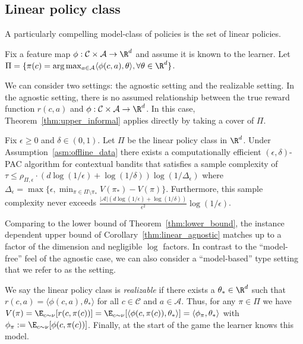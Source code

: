 \documentclass{article}
\newcommand{\mc}[1]{\mathcal{#1}}
\newcommand{\1}{\mathbf{1}}
\renewcommand{\v}{r} %
\begin{document}
\subsection{Linear policy class}\label{sec:linear}

A particularly compelling model-class of policies is the set of linear policies. 

\begin{definition}\label{def:linear_policy_class}
Fix a feature map $\phi: \mc{C} \times \mc{A} \rightarrow \R^d$ and assume it is known to the learner.
Let $\Pi = \{ \pi(c) = \arg\max_{a \in \mc{A}} \langle \phi(c,a) , \theta \rangle , \forall \theta \in \R^d \}$.
\end{definition}
\noindent We can consider two settings: the agnostic setting and the realizable setting.
In the agnostic setting, there is no assumed relationship between the true reward function $\v(c,a)$ and $\phi: \mc{C} \times \mc{A} \rightarrow \R^d$.
In this case, Theorem~\ref{thm:upper_informal} applies directly by taking a cover of $\Pi$. 
\begin{corollary}\label{thm:linear_agnostic}
Fix $\epsilon \geq 0$ and $\delta \in (0,1)$.
Let $\Pi$ be the linear policy class in $\R^d$.
Under Assumption~\ref{asm:offline_data} there exists a computationally efficient $(\epsilon,\delta)$-PAC algorithm for contextual bandits that satisfies a sample complexity of $\tau \leq \rho_{\Pi,\epsilon} \cdot ( d \log(1/\epsilon) + \log( 1 /\delta )) \log(1/\Delta_\epsilon)$ where $\Delta_\epsilon = \max\{ \epsilon, \min_{\pi \in \Pi \setminus \pi_*}V(\pi_*)-V(\pi) \}$. Furthermore, this sample complexity never exceeds $\frac{|\mc{A}| (d \log(1/\epsilon) + \log(1/\delta))}{\epsilon^2} \log(1/\epsilon)$.
\end{corollary}
\noindent Comparing to the lower bound of Theorem~\ref{thm:lower_bound}, the instance dependent upper bound of Corollary~\ref{thm:linear_agnostic} matches up to a factor of the dimension and negligible $\log$ factors. 
In contrast to the ``model-free'' feel of the agnostic case, we can also consider a ``model-based'' type setting that we refer to as the  setting.
\begin{definition}[Realizable]\label{def:realizable}
We say the linear policy class is \emph{realizable} if there exists a $\theta_* \in \R^d$ such that $\v(c,a) = \langle \phi(c,a) , \theta_* \rangle$ for all $c \in \mc{C}$ and $a \in \mc{A}$.
Thus, for any $\pi \in \Pi$ we have $V(\pi) = \E_{c \sim \nu}[ \v(c, \pi(c)) ] = \E_{c \sim \nu}[ \langle \phi(c,\pi(c)), \theta_* \rangle ] = \langle \phi_\pi , \theta_* \rangle$ with $\phi_\pi := \E_{c \sim \nu}[ \phi(c,\pi(c)) ]$.
Finally, at the start of the game the learner knows this model.%
\end{definition}
\end{document}
